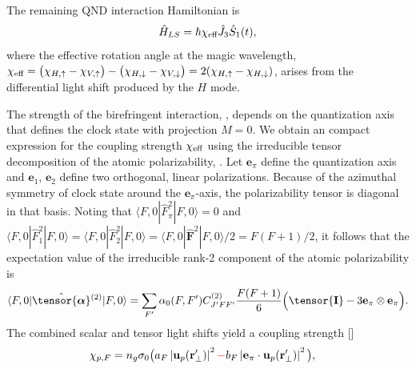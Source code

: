 \documentclass[preprint,aps,pra,onecolumn]{revtex4-1} %
\newcommand{\poltens}{\hat{\tensor{\boldsymbol{\alpha}}}}
\newcommand{\unittens}{\tensor{\mathbf{I}}}
\newcommand{\error}[1]{{\color{red} #1}}
\begin{document}
The remaining QND interaction Hamiltonian is
	\begin{equation} \label{Eq::FaradayHam}
		\hat{H}_{LS} = \hbar \chi_{\text{eff}} \hat{J}_3 \hat{S}_1(t),
	\end{equation}
where the effective rotation angle at the magic wavelength,
$\chi_{\text{eff}} = \big( \chi_{H, \uparrow} - \chi_{V,\uparrow} \big) - \big(\chi_{H,\downarrow} - \chi_{V,\downarrow} \big) = 2(\chi_{H, \uparrow}-\chi_{H, \downarrow})$, arises from the differential light shift produced by the $H$ mode.   

The strength of the birefringent interaction, , depends on the quantization axis that defines the clock state with projection $M=0$.  We obtain an compact expression for the coupling strength $\chi_{\text{eff}}$ using the irreducible tensor decomposition of the atomic polarizability, .  Let $\mathbf{e}_\pi$ define the quantization axis and $\mathbf{e}_{1}$, $\mathbf{e}_{2}$ define two orthogonal, linear polarizations.  Because of the azimuthal symmetry of clock state around the $\mathbf{e}_\pi$-axis, the polarizability tensor is diagonal in that basis.  Noting that $\langle F,0 | \hat{F}_{\pi}^2| F,0 \rangle =0$ and $\langle F,0 | \hat{F}_{1}^2| F,0 \rangle = \langle F,0 | \hat{F}_{2}^2| F,0 \rangle = \langle F,0 | \hat{\mathbf{F}}^2| F,0 \rangle /2 =F(F+1)/2$, it follows that the expectation value of the irreducible rank-2 component of the atomic polarizability is
	\begin{align} \label{Eq::CouplingAngleMagic}
		\langle F,0 | \poltens \phantom{}^{(2)}| F,0 \rangle  %
		= \sum_{F'} \alpha_0(F,F') C^{(2)}_{J'FF'} \frac{F(F+1)}{6} \Big( \unittens - 3\mathbf{e}_\pi \otimes \mathbf{e}_\pi \Big).
	\end{align}
The combined scalar and tensor light shifts yield a coupling strength []
	\begin{align}
		\chi_{p,F} %
		&  = n_g \sigma_0 \big(  a_{F} \left|\mathbf{u}_p(\br'_\perp)\right|^2 \error{-} b_{F} \left|\mathbf{e}_\pi \cdot \mathbf{u}_p(\br'_\perp)\right|^2 \big), \label{Eq::ClockStateCoupling}
	\end{align}
\end{document}
